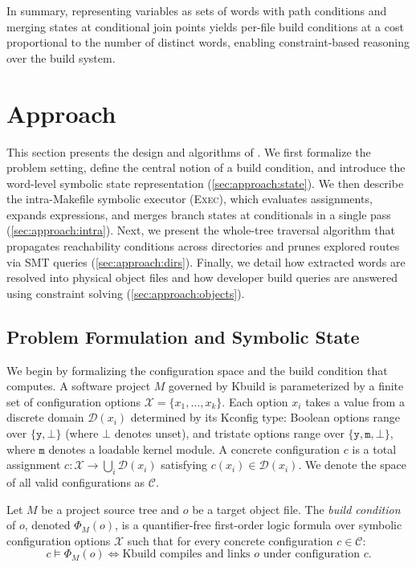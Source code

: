 \documentclass[acmsmall,screen,review,anonymous,nonacm]{acmart}
\begin{document}
  In summary, representing variables as sets of words with path conditions and merging states at conditional join points yields per-file build conditions at a cost proportional to the number of distinct words, enabling constraint-based reasoning over the build system.

\section{Approach}
  \label{sec:approach}
  This section presents the design and algorithms of \tool{}.
  We first formalize the problem setting, define the central notion of a build condition, and introduce the word-level symbolic state representation (\autoref{sec:approach:state}).
  We then describe the intra-Makefile symbolic executor (\textsc{Exec}), which evaluates assignments, expands expressions, and merges branch states at conditionals in a single pass (\autoref{sec:approach:intra}).
  Next, we present the whole-tree traversal algorithm that propagates reachability conditions across directories and prunes explored routes via SMT queries (\autoref{sec:approach:dirs}).
  Finally, we detail how extracted words are resolved into physical object files and how developer build queries are answered using constraint solving (\autoref{sec:approach:objects}).

  \subsection{Problem Formulation and Symbolic State}\label{sec:approach:state}
  We begin by formalizing the configuration space and the build condition that \tool{} computes.
  A software project $M$ governed by Kbuild is parameterized by a finite set of configuration options $\mathcal{X} = \{x_1, \dots, x_k\}$.
  Each option $x_i$ takes a value from a discrete domain $\mathcal{D}(x_i)$ determined by its Kconfig type: Boolean options range over $\{\mathtt{y}, \bot\}$ (where $\bot$ denotes unset), and tristate options range over $\{\mathtt{y}, \mathtt{m}, \bot\}$, where $\mathtt{m}$ denotes a loadable kernel module.
  A concrete configuration $c$ is a total assignment $c : \mathcal{X} \to \bigcup_{i} \mathcal{D}(x_i)$ satisfying $c(x_i) \in \mathcal{D}(x_i)$.
  We denote the space of all valid configurations as $\mathcal{C}$.

  \begin{definition}\label{def:build-condition}
  Let $M$ be a project source tree and $o$ be a target object file.
  The \emph{build condition} of $o$, denoted $\Phi_M(o)$, is a quantifier-free first-order logic formula over symbolic configuration options $\mathcal{X}$ such that for every concrete configuration $c \in \mathcal{C}$:
  \[
    c \models \Phi_M(o) \iff \text{Kbuild compiles and links } o \text{ under configuration } c.
  \]
  \end{definition}
\end{document}
